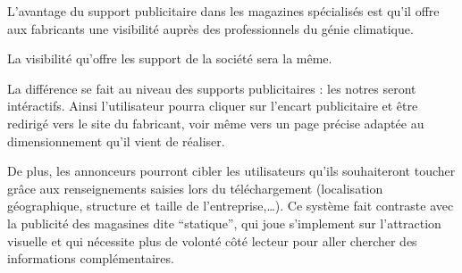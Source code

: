 	L'avantage du support publicitaire dans les magazines spécialisés
	est qu'il offre aux fabricants une visibilité auprès des professionnels
	du génie climatique.

	La visibilité qu'offre les support de la société \K{} sera la même.

	La différence se fait au niveau des supports publicitaires : les notres
	seront intéractifs. Ainsi l'utilisateur pourra cliquer sur l'encart publicitaire
	et être redirigé vers le site du fabricant, voir même vers un page précise
	adaptée au dimensionnement qu'il vient de réaliser.

	De plus, les annonceurs pourront cibler les utilisateurs qu'ils souhaiteront toucher
	grâce aux renseignements saisies lors du téléchargement (localisation géographique,
	structure et taille de l'entreprise,\ldots). Ce système fait contraste avec la
	publicité des magasines dite ``statique'', qui joue s'implement sur l'attraction
	visuelle et qui nécessite plus de volonté côté lecteur pour aller chercher des
	informations complémentaires.
	
